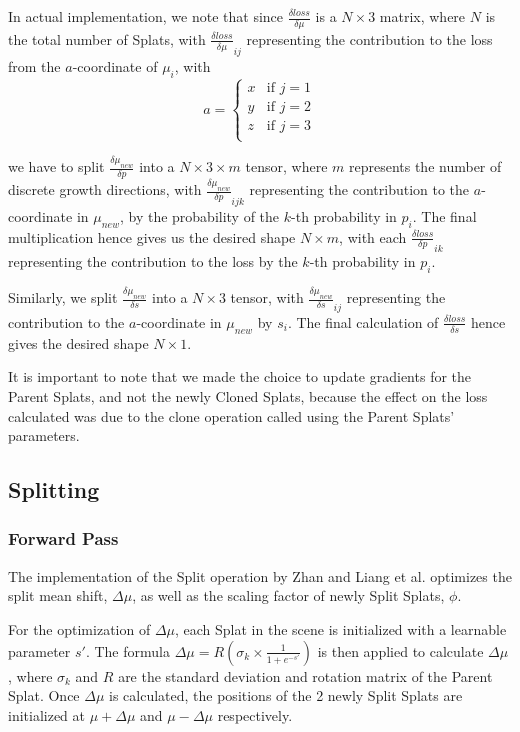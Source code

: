 \documentclass[11pt]{report}
\begin{document}
In actual implementation, we note that since $\frac{\delta loss}{\delta \mu}$ is a $N \times 3$ matrix, where $N$ is the total number of Splats, with $\frac{\delta loss}{\delta \mu}_{ij}$ representing the contribution to the loss from the $a$-coordinate of $\mu_{i}$, with
\[ a = \begin{cases}
x & \textrm{if }j=1\\
y & \textrm{if }j=2\\
z & \textrm{if }j=3\\
\end{cases} \]

we have to split $\frac{\delta \mu_{new}}{\delta p}$ into a $N \times 3 \times m$ tensor, where $m$ represents the number of discrete growth directions, with $\frac{\delta \mu_{new}}{\delta p}_{ijk}$ representing the contribution to the $a$-coordinate in $\mu_{new}$, by the probability of the $k$-th probability in $p_{i}$. The final multiplication hence gives us the desired shape $N \times m$, with each $\frac{\delta loss}{\delta p}_{ik}$ representing the contribution to the loss by the $k$-th probability in $p_{i}$.

Similarly, we split $\frac{\delta \mu_{new}}{\delta s}$ into a $N \times 3$ tensor, with $\frac{\delta \mu_{new}}{\delta s}_{ij}$ representing the contribution to the $a$-coordinate in $\mu_{new}$ by $s_{i}$. The final calculation of $\frac{\delta loss}{\delta s}$ hence gives the desired shape $N \times 1$.

It is important to note that we made the choice to update gradients for the Parent Splats, and not the newly Cloned Splats, because the effect on the loss calculated was due to the clone operation called using the Parent Splats' parameters.

\subsection{Splitting}
\subsubsection{Forward Pass}
The implementation of the Split operation by Zhan and Liang et al. optimizes the split mean shift, $\Delta \mu$, as well as the scaling factor of newly Split Splats, $\phi$.

For the optimization of $\Delta \mu$, each Splat in the scene is initialized with a learnable parameter $s'$. The formula $\Delta \mu = R(\sigma_{k} \times \frac{1}{1 + e^{-s'}})$ is then applied to calculate $\Delta \mu$, where $\sigma_{k}$ and $R$ are the standard deviation and rotation matrix of the Parent Splat. Once $\Delta \mu$ is calculated, the positions of the 2 newly Split Splats are initialized at $\mu + \Delta \mu$ and $\mu - \Delta \mu$ respectively.
\end{document}
